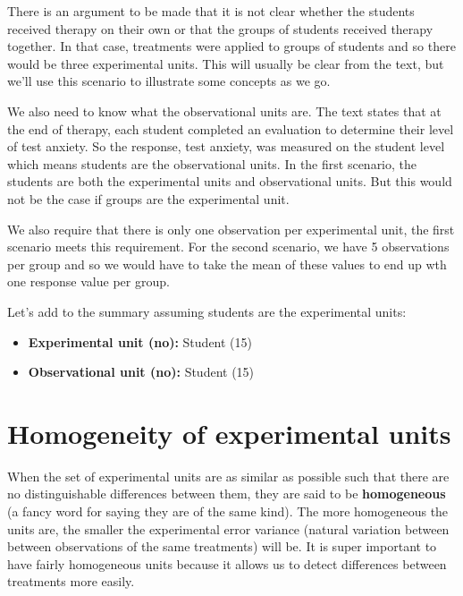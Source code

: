 \documentclass[
  letterpaper,
  DIV=11,
  numbers=noendperiod,
  oneside]{scrreprt}
\providecommand{\tightlist}{%
  \setlength{\itemsep}{0pt}\setlength{\parskip}{0pt}}\usepackage{longtable,booktabs,array}
\begin{document}
There is an argument to be made that it is not clear whether the
students received therapy on their own or that the groups of students
received therapy together. In that case, treatments were applied to
groups of students and so there would be three experimental units. This
will usually be clear from the text, but we'll use this scenario to
illustrate some concepts as we go.

We also need to know what the observational units are. The text states
that at the end of therapy, each student completed an evaluation to
determine their level of test anxiety. So the response, test anxiety,
was measured on the student level which means students are the
observational units. In the first scenario, the students are both the
experimental units and observational units. But this would not be the
case if groups are the experimental unit.

We also require that there is only one observation per experimental
unit, the first scenario meets this requirement. For the second
scenario, we have 5 observations per group and so we would have to take
the mean of these values to end up wth one response value per group.

Let's add to the summary assuming students are the experimental units:

\begin{itemize}
\tightlist
\item
  \textbf{Experimental unit (no):} Student (15)\\
\item
  \textbf{Observational unit (no):} Student (15)
\end{itemize}

\section*{\texorpdfstring{\textbf{Homogeneity of experimental
units}}{Homogeneity of experimental units}}\label{homogeneity-of-experimental-units}


When the set of experimental units are as similar as possible such that
there are no distinguishable differences between them, they are said to
be \textbf{homogeneous} (a fancy word for saying they are of the same
kind). The more homogeneous the units are, the smaller the experimental
error variance (natural variation between between observations of the
same treatments) will be. It is super important to have fairly
homogeneous units because it allows us to detect differences between
treatments more easily.
\end{document}
